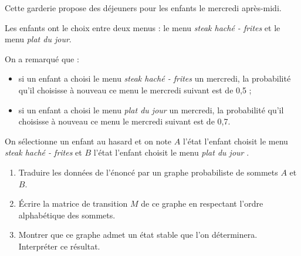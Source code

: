 \par
Cette garderie propose des déjeuners pour les enfants le mercredi après-midi.
\par
Les enfants ont le choix entre deux menus : le menu \textit{steak haché - frites} et le menu \textit{plat du jour}.
\par
On a remarqué que :
\par
\begin{itemize}
     \item
     si un enfant a choisi le menu \textit{steak haché - frites} un mercredi, la probabilité qu'il choisisse à nouveau ce menu le mercredi suivant est de 0,5 ;
     \item
     si un enfant a choisi le menu \textit{plat du jour} un mercredi, la probabilité qu'il choisisse à nouveau ce menu le mercredi suivant est de 0,7.
\end{itemize}
\par
On sélectionne un enfant au hasard et on note $A$ l'état \og l'enfant choisit le menu \textit{steak haché - frites} \fg{} et $B$ l'état \og l'enfant choisit le menu \textit{plat du jour} \fg{}.
\par
\begin{enumerate}
     \item Traduire les données de l'énoncé par un graphe probabiliste de sommets $A$ et $B$.
     \item Écrire la matrice de transition $M$ de ce graphe en respectant l'ordre alphabétique des sommets.
     \item Montrer que ce graphe admet un état stable que l'on déterminera.\\
     Interpréter ce résultat.
\end{enumerate}
